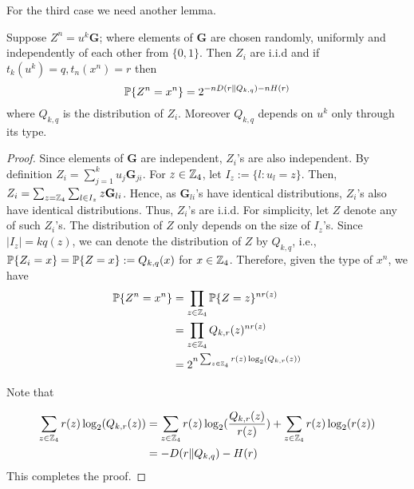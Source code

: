For the third case we need another lemma.

\begin{lem}\label{lem: p_u case 3}
Suppose $Z^n=u^k\mathbf{G}$; where elements of $\mathbf{G}$ are chosen randomly, uniformly and independently of each other from $\{ 0,1 \}$.  Then $Z_i$ are i.i.d and if $t_k(u^k)=q, t_n(x^n)=r$ then
\begin{equation}
\mathbb{P}\{ Z^n=x^n\}=2^{-nD(r\| Q_{k,q})-nH(r)}
\end{equation}
where $Q_{k,q}$ is the distribution of $Z_i$. Moreover $Q_{k,q}$ depends on $u^k$ only through its type.
\end{lem}

\begin{proof}
Since elements of $\mathbf{G}$ are independent, $Z_i$'s are also independent. By definition $Z_i=\sum_{j=1}^{k} u_j\mathbf{G}_{ji}$. For $z\in \mathbb{Z}_4$, let $I_z:=\{l: u_l=z\}$. Then, $Z_i=\sum_{z=\mathbb{Z}_4} \sum_{l\in I_z} z\mathbf{G}_{li}$.  Hence, as $\mathbf{G}_{li}$'s have identical distributions, $Z_i$'s also have identical distributions. Thus, $Z_i$'s are i.i.d. For simplicity, let $Z$ denote any of such $Z_i$'s. The distribution of $Z$ only depends on the size of $I_z$'s. Since $|I_z|=kq(z)$, we can denote the distribution of $Z$ by $Q_{k,q}$, i.e., $\mathbb{P}\{Z_i=x\}=\mathbb{P}\{Z=x\}:=Q_{k,q}(x)$ for $x\in \mathbb{Z}_4$. Therefore, given the type of $x^n$, we have
\begin{align*}
\mathbb{P}\{ Z^n=x^n\}&=\prod_{z\in \mathbb{Z}_4}\mathbb{P}\{ Z=z\}^{nr(z)}\\
&=\prod_{z\in \mathbb{Z}_4}Q_{k,r}(z)^{nr(z)}\\
&=2^{n\sum_{z\in \mathbb{Z}_4}{r(z)\log_2(Q_{k,r}(z))} }
\end{align*}

Note that

\begin{align*}
\sum_{z\in \mathbb{Z}_4}{r(z)\log_2(Q_{k,r}(z))}&=\sum_{z\in \mathbb{Z}_4}{r(z)\log_2(\frac{Q_{k,r}(z)}{r(z)})}+\sum_{z\in \mathbb{Z}_4}{r(z)\log_2(r(z))}\\
&=-D(r\| Q_{k,q})-H(r)
\end{align*}
This completes the proof.
\end{proof}


